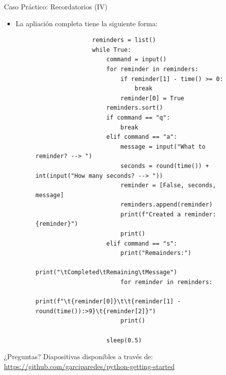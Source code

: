 \documentclass{beamer}
\begin{document}
    \begin{frame}[fragile]{Caso Práctico: Recordatorios (IV)}
      \begin{itemize}
        \item La apliación completa tiene la siguiente forma:
        \begin{figure}
            \begin{minipage}[c]{\textwidth}
                \begin{verbatim}
                reminders = list()
                while True:
                    command = input()
                    for reminder in reminders:
                        if reminder[1] - time() >= 0:
                            break
                        reminder[0] = True
                    reminders.sort()
                    if command == "q":
                        break
                    elif command == "a":
                        message = input("What to reminder? --> ")
                        seconds = round(time()) + int(input("How many seconds? --> "))
                        reminder = [False, seconds, message]
                        reminders.append(reminder)
                        print(f"Created a reminder: {reminder}")
                        print()
                    elif command == "s":
                        print("Remainders:")
                        print("\tCompleted\tRemaining\tMessage")
                        for reminder in reminders:
                            print(f"\t{reminder[0]}\t\t{reminder[1] - round(time()):>9}\t{reminder[2]}")
                        print()

                    sleep(0.5)
                \end{verbatim}
            \end{minipage}
        \end{figure}
      \end{itemize}
    \end{frame}

    \begin{frame}
        \begin{center}
            {\Huge ¿Preguntas?}
            \vfill
            Diapositivas disponibles a través de:
            \\
            {\small\url{https://github.com/garciparedes/python-getting-started}}
        \end{center}
    \end{frame}
\end{document}
